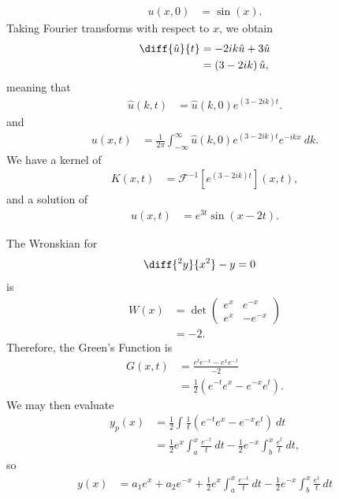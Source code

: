 \documentclass[10pt]{mypackage}
\begin{document}
\begin{solution}
\begin{enumerate}[(A)]
      \begin{align*}
        u\left( x,0 \right) &= \sin\left( x \right).
      \end{align*}
      Taking Fourier transforms with respect to $x$, we obtain
      \begin{align*}
        \diff{\hat{u}}{t} &= -2ik\hat{u} + 3\hat{u}\\
                          &= \left( 3-2ik \right)\hat{u},
      \end{align*}
      meaning that
      \begin{align*}
        \hat{u}\left( k,t \right) &= \hat{u}\left( k,0 \right)e^{\left( 3-2ik \right)t}.
      \end{align*}
      and
      \begin{align*}
        u\left( x,t \right) &= \frac{1}{2\pi} \int_{-\infty}^{\infty} \hat{u}\left( k,0 \right)e^{\left( 3-2ik \right)t}e^{-ikx}\:dk.
      \end{align*}
      We have a kernel of
      \begin{align*}
        K\left( x,t \right) &= \mathcal{F}^{-1}\left[ e^{\left( 3-2ik \right)t} \right]\left( x,t \right),
      \end{align*}
      and a solution of
      \begin{align*}
        u\left( x,t \right) &= e^{3t}\sin\left( x-2t \right).
      \end{align*}
  \end{enumerate}
\end{solution}
\begin{solution}[4.6, Problem 32]
  The Wronskian for
  \begin{align*}
    \diff{^2y}{x^2} - y &= 0
  \end{align*}
  is
  \begin{align*}
    W(x) &= \det \begin{pmatrix}e^{x} & e^{-x} \\ e^{x} & -e^{-x}\end{pmatrix}\\
         &= -2.
  \end{align*}
  Therefore, the Green's Function is
  \begin{align*}
    G\left( x,t \right) &= \frac{e^{t}e^{-x} - e^{x}e^{-t}}{-2}\\
                        &= \frac{1}{2}\left( e^{-t}e^{x} - e^{-x}e^{t} \right).
  \end{align*}
  We may then evaluate
  \begin{align*}
    y_p(x) &= \frac{1}{2}\int_{}^{} \frac{1}{t}\left( e^{-t}e^{x} - e^{-x}e^{t} \right)\:dt\\
           &= \frac{1}{2} e^{x}\int_{a}^{x} \frac{e^{-t}}{t}\:dt - \frac{1}{2}e^{-x} \int_{b}^{x} \frac{e^{t}}{t}\:dt,
  \end{align*}
  so
  \begin{align*}
    y(x) &= a_1 e^{x} + a_2e^{-x} + \frac{1}{2} e^{x}\int_{a}^{x} \frac{e^{-t}}{t}\:dt - \frac{1}{2}e^{-x} \int_{b}^{x} \frac{e^{t}}{t}\:dt
  \end{align*}
\end{solution}
\end{document}
